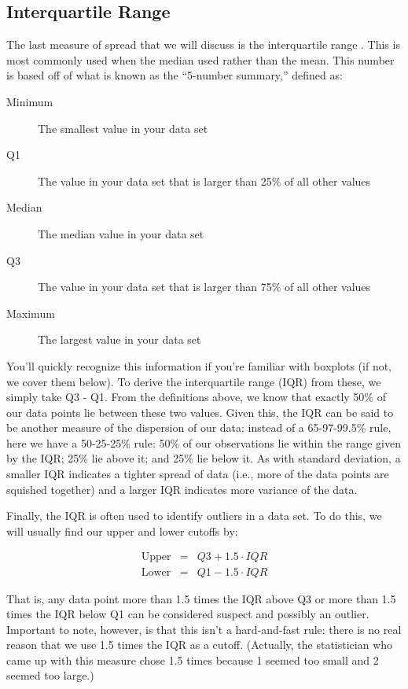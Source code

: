 \subsection{Interquartile Range}
The last measure of spread that we will discuss is the interquartile range . This is most commonly used when the median used rather than the mean. This number is based off of what is known as the ``5-number summary,'' defined as:

\begin{description}
\item[Minimum]{The smallest value in your data set}
\item[Q1]{The value in your data set that is larger than 25\% of all other values}
\item[Median]{The median value in your data set}
\item[Q3]{The value in your data set that is larger than 75\% of all other values}
\item[Maximum]{The largest value in your data set}
\end{description}

You'll quickly recognize this information if you're familiar with boxplots (if not, we cover them below). To derive the interquartile range (IQR) from these, we simply take Q3 - Q1. From the definitions above, we know that exactly 50\% of our data points lie between these two values. Given this, the IQR can be said to be another measure of the dispersion of our data: instead of a 65-97-99.5\% rule, here we have a 50-25-25\% rule: 50\% of our observations lie within the range given by the IQR; 25\% lie above it; and 25\% lie below it. As with standard deviation, a smaller IQR indicates a tighter spread of data (i.e., more of the data points are squished together) and a larger IQR indicates more variance of the data.

Finally, the IQR is often used to identify outliers in a data set. To do this, we will usually find our upper and lower cutoffs by:

\begin{eqnarray*}
    \text{Upper} &=& Q3+1.5\cdot IQR \\
    \text{Lower} &=& Q1-1.5\cdot IQR
\end{eqnarray*}

That is, any data point more than 1.5 times the IQR above Q3 or more than 1.5 times the IQR below Q1 can be considered suspect and possibly an outlier. Important to note, however, is that this isn't a hard-and-fast rule: there is no real reason that we use 1.5 times the IQR as a cutoff. (Actually, the statistician who came up with this measure chose 1.5 times because 1 seemed too small and 2 seemed too large.)

